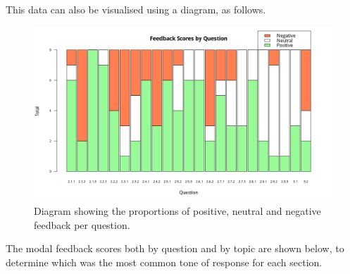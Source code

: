 \documentclass[12pt,twoside,notitlepage,xetex]{report}
\begin{document}
This data can also be visualised using a diagram, as follows.

\begin{center}
\begin{figure}[H]
\begin{center}
\includegraphics[width=\textwidth]{figs/graphs/stacked-scores.png}
\end{center}
\caption{Diagram showing the proportions of positive, neutral and negative feedback per question.}
\label{fig:StackedScores}
\end{figure}
\end{center}

The modal feedback scores both by question and by topic are shown below, to determine which was the most common tone of response for each section.
\end{document}
